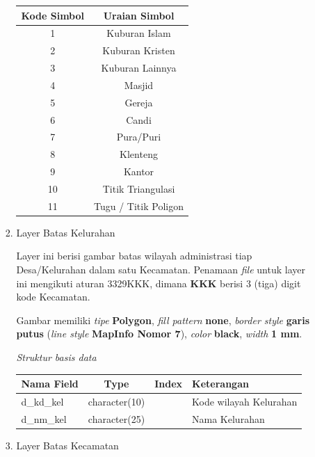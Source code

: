 \begin{enumerate}[\bfseries A.]
\begin{enumerate}[1.]
\begin{enumerate}[1.]
      \begin{tabular}{| c | c |}
        \hline
        Kode Simbol & Uraian Simbol \\
        \hline
        1 & Kuburan Islam \\
        \hline
        2 & Kuburan Kristen \\
        \hline
        3 & Kuburan Lainnya \\
        \hline
        4 & Masjid \\
        \hline
        5 & Gereja \\
        \hline
        6 & Candi \\
        \hline
        7 & Pura/Puri \\
        \hline
        8 & Klenteng \\
        \hline
        9 & Kantor \\
        \hline
        10 & Titik Triangulasi \\
        \hline
        11 & Tugu / Titik Poligon \\
        \hline
      \end{tabular}
      
      \item Layer Batas Kelurahan
      
      Layer ini berisi gambar batas wilayah administrasi tiap Desa/Kelurahan dalam satu Kecamatan. Penamaan \textit{file} untuk layer ini mengikuti aturan 3329KKK, dimana \textbf{KKK} berisi 3 (tiga) digit kode Kecamatan.
      
      Gambar memiliki \textit{tipe} \textbf{Polygon}, \textit{fill pattern} \textbf{none}, \textit{border style} \textbf{garis putus} (\textit{line style} \textbf{MapInfo Nomor 7}), \textit{color} \textbf{black}, \textit{width} \textbf{1 mm}.
      
      \textit{Struktur basis data} 
      
      \begin{tabular}{| l | c | c | p{5cm} |}
        \hline
        Nama Field & Type & Index & Keterangan \\
        \hline
        d\_kd\_kel & character(10) & & Kode wilayah Kelurahan \\
        \hline
        d\_nm\_kel & character(25) & & Nama Kelurahan \\
        \hline
      \end{tabular}
      
      \item Layer Batas Kecamatan
      

\end{enumerate}
\end{enumerate}
\end{enumerate}
